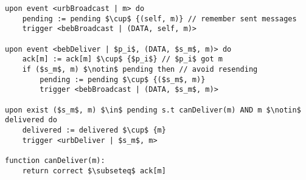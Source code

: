 \begin{lstlisting}[mathescape, caption={Uniform reliable broadcast}, captionpos=b]
upon event <urbBroadcast | m> do
    pending := pending $\cup$ {(self, m)} // remember sent messages
    trigger <bebBroadcast | (DATA, self, m)>

upon event <bebDeliver | $p_i$, (DATA, $s_m$, m)> do
    ack[m] := ack[m] $\cup$ {$p_i$} // $p_i$ got m
    if ($s_m$, m) $\notin$ pending then // avoid resending
        pending := pending $\cup$ {($s_m$, m)}
        trigger <bebBroadcast | (DATA, $s_m$, m)>

upon exist ($s_m$, m) $\in$ pending s.t canDeliver(m) AND m $\notin$ delivered do
    delivered := delivered $\cup$ {m}
    trigger <urbDeliver | $s_m$, m>

function canDeliver(m):
    return correct $\subseteq$ ack[m]
\end{lstlisting}

